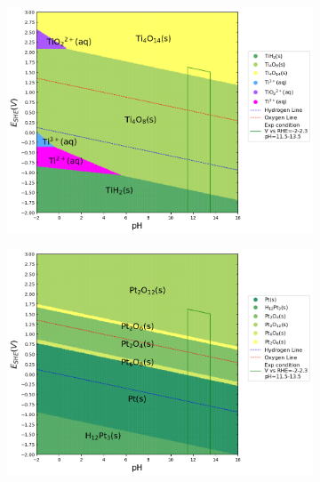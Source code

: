 \documentclass[journal=jacsat,manuscript=article]{achemso}
\begin{document}

\begin{figure}[htbp]
    \centering
    \begin{subfigure}[b]{0.45\textwidth}
        \subcaption{}\label{fig:Ti_Pourbaix_NH3_Gly_CN}
        \includegraphics[width=\textwidth]{Figures/pourbaix_diagrams/Ti-NH3-H2O_activity=1e-04_[NH3]=0.02M_[Gly]=0.005M_[CN]=0.0001.png}
        \par\medskip
    \end{subfigure}
    \begin{subfigure}[b]{0.45\textwidth}
        \subcaption{}\label{fig:Pt_Pourbaix_NH3_Gly_CN}
        \includegraphics[width=\textwidth]{Figures/pourbaix_diagrams/Pt-NH3-H2O_activity=1e-04_[NH3]=0.02M_[Gly]=0.005M_[CN]=0.0001.png}

\end{subfigure}
\end{figure}
\end{document}
